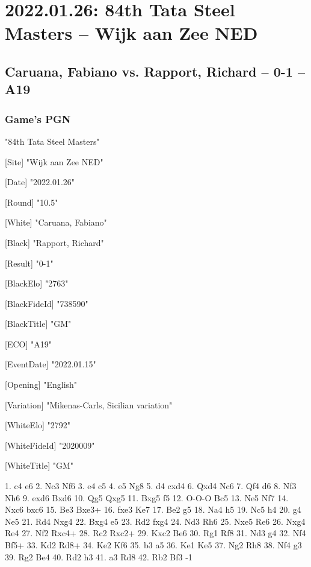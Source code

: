 \documentclass[9pt]{extarticle}
\begin{document}
\section*{2022.01.26: 84th Tata Steel Masters -- Wijk aan Zee NED}

\subsection*{Caruana, Fabiano vs. Rapport, Richard -- 0-1 -- A19}
\subsubsection*{Game's PGN}
\begin{flushleft}
[Event] "84th Tata Steel Masters"

[Site] "Wijk aan Zee NED"

[Date] "2022.01.26"

[Round] "10.5"

[White] "Caruana, Fabiano"

[Black] "Rapport, Richard"

[Result] "0-1"

[BlackElo] "2763"

[BlackFideId] "738590"

[BlackTitle] "GM"

[ECO] "A19"

[EventDate] "2022.01.15"

[Opening] "English"

[Variation] "Mikenas-Carls, Sicilian variation"

[WhiteElo] "2792"

[WhiteFideId] "2020009"

[WhiteTitle] "GM"

\end{flushleft}
\begin{flushleft}
1. c4 e6 2. Nc3 Nf6 3. e4 c5 4. e5 Ng8 5. d4 cxd4 6. Qxd4 Nc6 7. Qf4 d6 8. Nf3 Nh6 9. exd6 Bxd6 10. Qg5 Qxg5 11. Bxg5 f5 12. O-O-O Bc5 13. Ne5 Nf7 14. Nxc6 bxc6 15. Be3 Bxe3+ 16. fxe3 Ke7 17. Be2 g5 18. Na4 h5 19. Nc5 h4 20. g4 Ne5 21. Rd4 Nxg4 22. Bxg4 e5 23. Rd2 fxg4 24. Nd3 Rh6 25. Nxe5 Re6 26. Nxg4 Re4 27. Nf2 Rxc4+ 28. Rc2 Rxc2+ 29. Kxc2 Be6 30. Rg1 Rf8 31. Nd3 g4 32. Nf4 Bf5+ 33. Kd2 Rd8+ 34. Ke2 Kf6 35. b3 a5 36. Ke1 Ke5 37. Ng2 Rh8 38. Nf4 g3 39. Rg2 Be4 40. Rd2 h3 41. a3 Rd8 42. Rb2 Bf3 \quad  {}-1
\end{flushleft}
\parindent 0mm
\end{document}
